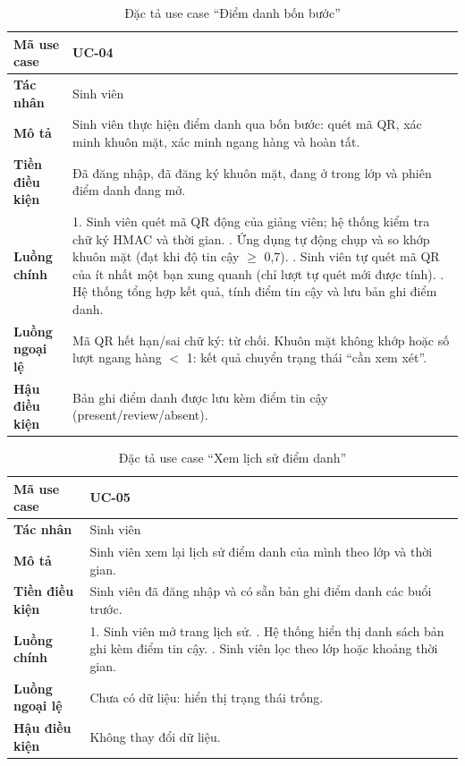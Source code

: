 \begin{table}[H]
\centering
\small
\caption{Đặc tả use case ``Điểm danh bốn bước''}
\label{tab:uc-attendance}
\begin{tabular}{|p{3cm}|p{10.6cm}|}
\hline
\textbf{Mã use case} & UC-04 \\ \hline
\textbf{Tác nhân} & Sinh viên \\ \hline
\textbf{Mô tả} & Sinh viên thực hiện điểm danh qua bốn bước: quét mã QR, xác minh khuôn mặt, xác minh ngang hàng và hoàn tất. \\ \hline
\textbf{Tiền điều kiện} & Đã đăng nhập, đã đăng ký khuôn mặt, đang ở trong lớp và phiên điểm danh đang mở. \\ \hline
\textbf{Luồng chính} & 1. Sinh viên quét mã QR động của giảng viên; hệ thống kiểm tra chữ ký HMAC và thời gian. \newline 2. Ứng dụng tự động chụp và so khớp khuôn mặt (đạt khi độ tin cậy $\geq$ 0,7). \newline 3. Sinh viên tự quét mã QR của ít nhất một bạn xung quanh (chỉ lượt tự quét mới được tính). \newline 4. Hệ thống tổng hợp kết quả, tính điểm tin cậy và lưu bản ghi điểm danh. \\ \hline
\textbf{Luồng ngoại lệ} & Mã QR hết hạn/sai chữ ký: từ chối. Khuôn mặt không khớp hoặc số lượt ngang hàng $<$ 1: kết quả chuyển trạng thái ``cần xem xét''. \\ \hline
\textbf{Hậu điều kiện} & Bản ghi điểm danh được lưu kèm điểm tin cậy (present/review/absent). \\ \hline
\end{tabular}
\end{table}

\begin{table}[H]
\centering
\small
\caption{Đặc tả use case ``Xem lịch sử điểm danh''}
\label{tab:uc-history}
\begin{tabular}{|p{3cm}|p{10.6cm}|}
\hline
\textbf{Mã use case} & UC-05 \\ \hline
\textbf{Tác nhân} & Sinh viên \\ \hline
\textbf{Mô tả} & Sinh viên xem lại lịch sử điểm danh của mình theo lớp và thời gian. \\ \hline
\textbf{Tiền điều kiện} & Sinh viên đã đăng nhập và có sẵn bản ghi điểm danh các buổi trước. \\ \hline
\textbf{Luồng chính} & 1. Sinh viên mở trang lịch sử. \newline 2. Hệ thống hiển thị danh sách bản ghi kèm điểm tin cậy. \newline 3. Sinh viên lọc theo lớp hoặc khoảng thời gian. \\ \hline
\textbf{Luồng ngoại lệ} & Chưa có dữ liệu: hiển thị trạng thái trống. \\ \hline
\textbf{Hậu điều kiện} & Không thay đổi dữ liệu. \\ \hline
\end{tabular}
\end{table}


